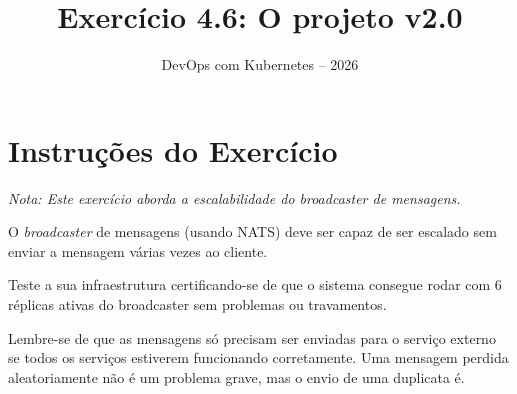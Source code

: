 \documentclass[11pt,a4paper]{article}
\title{\color{secondary}\Huge\textbf{Exercício 4.6: O projeto v2.0}}
\author{\color{primary}DevOps com Kubernetes -- 2026}
\date{}
\begin{document}
\maketitle

\section*{\color{primary}Instruções do Exercício}
\begin{tcolorbox}[colback=blue!5!white,colframe=blue!75!black,title=Exercício 4.6: O projeto v2.0]
\textit{Nota: Este exercício aborda a escalabilidade do broadcaster de mensagens.}

O \textit{broadcaster} de mensagens (usando NATS) deve ser capaz de ser escalado sem enviar a mensagem várias vezes ao cliente. 

Teste a sua infraestrutura certificando-se de que o sistema consegue rodar com 6 réplicas ativas do broadcaster sem problemas ou travamentos. 

Lembre-se de que as mensagens só precisam ser enviadas para o serviço externo se todos os serviços estiverem funcionando corretamente. Uma mensagem perdida aleatoriamente não é um problema grave, mas o envio de uma duplicata é.
\end{tcolorbox}
\end{document}
